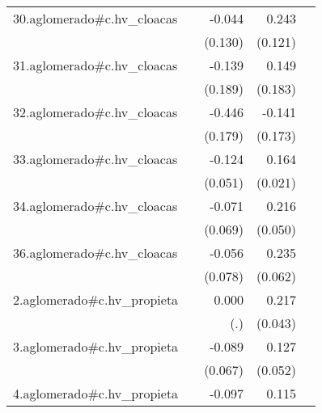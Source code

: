 {\begin{longtable}{l*{4}{D{.}{.}{-1}}}
\addlinespace
30.aglomerado#c.hv\_cloacas&                     &      -0.044         &       0.243\sym{*}  &                     \\
            &                     &     (0.130)         &     (0.121)         &                     \\
\addlinespace
31.aglomerado#c.hv\_cloacas&                     &      -0.139         &       0.149         &                     \\
            &                     &     (0.189)         &     (0.183)         &                     \\
\addlinespace
32.aglomerado#c.hv\_cloacas&                     &      -0.446\sym{*}  &      -0.141         &                     \\
            &                     &     (0.179)         &     (0.173)         &                     \\
\addlinespace
33.aglomerado#c.hv\_cloacas&                     &      -0.124\sym{*}  &       0.164\sym{***}&                     \\
            &                     &     (0.051)         &     (0.021)         &                     \\
\addlinespace
34.aglomerado#c.hv\_cloacas&                     &      -0.071         &       0.216\sym{***}&                     \\
            &                     &     (0.069)         &     (0.050)         &                     \\
\addlinespace
36.aglomerado#c.hv\_cloacas&                     &      -0.056         &       0.235\sym{***}&                     \\
            &                     &     (0.078)         &     (0.062)         &                     \\
\addlinespace
2.aglomerado#c.hv\_propieta&                     &       0.000         &       0.217\sym{***}&                     \\
            &                     &         (.)         &     (0.043)         &                     \\
\addlinespace
3.aglomerado#c.hv\_propieta&                     &      -0.089         &       0.127\sym{*}  &                     \\
            &                     &     (0.067)         &     (0.052)         &                     \\
\addlinespace
4.aglomerado#c.hv\_propieta&                     &      -0.097         &       0.115\sym{**} &                     \\

\end{longtable}}
